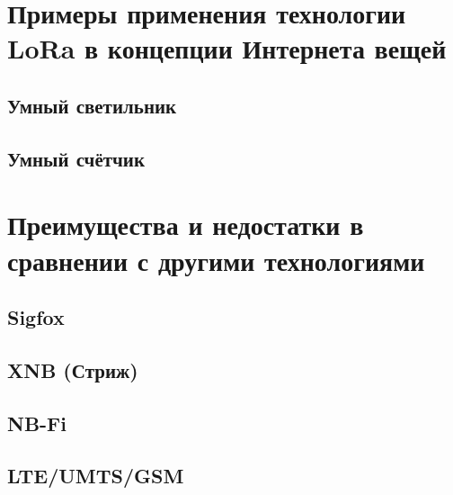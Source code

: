 

\section{Примеры применения технологии LoRa в концепции Интернета вещей}

\subsection{Умный светильник}

\subsection{Умный счётчик}


\section{Преимущества и недостатки в сравнении с другими технологиями}

\subsection{Sigfox}

\subsection{XNB (Стриж)}

\subsection{NB-Fi}

\subsection{LTE/UMTS/GSM}


